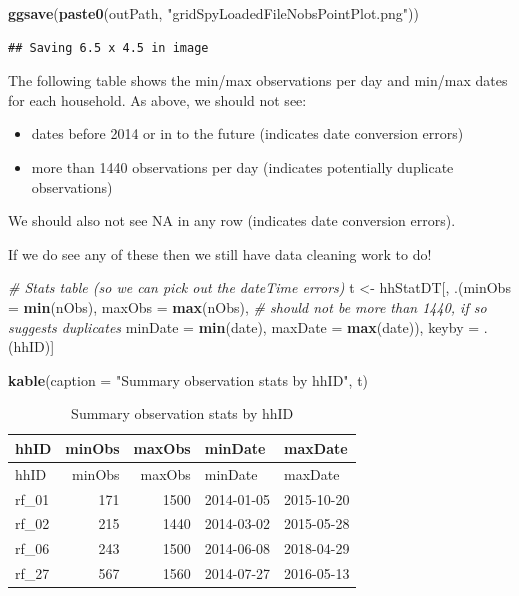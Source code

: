 \documentclass[]{article}
\newenvironment{Shaded}{\begin{snugshade}}{\end{snugshade}}
\newcommand{\KeywordTok}[1]{\textcolor[rgb]{0.13,0.29,0.53}{\textbf{#1}}}
\newcommand{\DataTypeTok}[1]{\textcolor[rgb]{0.13,0.29,0.53}{#1}}
\newcommand{\StringTok}[1]{\textcolor[rgb]{0.31,0.60,0.02}{#1}}
\newcommand{\CommentTok}[1]{\textcolor[rgb]{0.56,0.35,0.01}{\textit{#1}}}
\newcommand{\NormalTok}[1]{#1}
\providecommand{\tightlist}{%
  \setlength{\itemsep}{0pt}\setlength{\parskip}{0pt}}
\begin{document}
\begin{Shaded}
\begin{Highlighting}[]
\KeywordTok{ggsave}\NormalTok{(}\KeywordTok{paste0}\NormalTok{(outPath, }\StringTok{"gridSpyLoadedFileNobsPointPlot.png"}\NormalTok{))}
\end{Highlighting}
\end{Shaded}

\begin{verbatim}
## Saving 6.5 x 4.5 in image
\end{verbatim}

The following table shows the min/max observations per day and min/max
dates for each household. As above, we should not see:

\begin{itemize}
\tightlist
\item
  dates before 2014 or in to the future (indicates date conversion
  errors)
\item
  more than 1440 observations per day (indicates potentially duplicate
  observations)
\end{itemize}

We should also not see NA in any row (indicates date conversion errors).

If we do see any of these then we still have data cleaning work to do!

\begin{Shaded}
\begin{Highlighting}[]
\CommentTok{# Stats table (so we can pick out the dateTime errors)}
\NormalTok{t <-}\StringTok{ }\NormalTok{hhStatDT[, .(}\DataTypeTok{minObs =} \KeywordTok{min}\NormalTok{(nObs),}
             \DataTypeTok{maxObs =} \KeywordTok{max}\NormalTok{(nObs), }\CommentTok{# should not be more than 1440, if so suggests duplicates}
             \DataTypeTok{minDate =} \KeywordTok{min}\NormalTok{(date),}
             \DataTypeTok{maxDate =} \KeywordTok{max}\NormalTok{(date)),}
\NormalTok{         keyby =}\StringTok{ }\NormalTok{.(hhID)]}

\KeywordTok{kable}\NormalTok{(}\DataTypeTok{caption =} \StringTok{"Summary observation stats by hhID"}\NormalTok{, t)}
\end{Highlighting}
\end{Shaded}

\begin{longtable}[]{@{}lrrll@{}}
\caption{Summary observation stats by hhID}\tabularnewline
\toprule
hhID & minObs & maxObs & minDate & maxDate\tabularnewline
\midrule
\endfirsthead
\toprule
hhID & minObs & maxObs & minDate & maxDate\tabularnewline
\midrule
\endhead
rf\_01 & 171 & 1500 & 2014-01-05 & 2015-10-20\tabularnewline
rf\_02 & 215 & 1440 & 2014-03-02 & 2015-05-28\tabularnewline
rf\_06 & 243 & 1500 & 2014-06-08 & 2018-04-29\tabularnewline
rf\_27 & 567 & 1560 & 2014-07-27 & 2016-05-13\tabularnewline
\bottomrule
\end{longtable}
\end{document}
